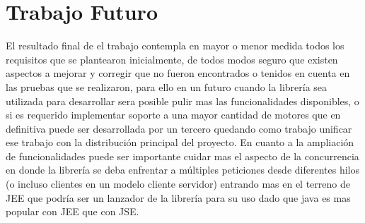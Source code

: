 \chapter*{Trabajo Futuro}
El resultado final de el trabajo contempla en mayor o menor medida todos los requisitos que se plantearon inicialmente, de todos modos seguro que existen aspectos a mejorar y corregir que no fueron encontrados o tenidos en cuenta en las pruebas que se realizaron, para ello en un futuro cuando la librería sea utilizada para desarrollar sera posible pulir mas las funcionalidades disponibles, o si es requerido implementar soporte a una mayor cantidad de motores que en definitiva puede ser desarrollada por un tercero quedando como trabajo unificar ese trabajo con la distribución principal del proyecto.
En cuanto a la ampliación de funcionalidades puede ser importante cuidar mas el aspecto de la concurrencia en donde la librería se deba enfrentar a múltiples peticiones desde diferentes hilos (o incluso clientes en un modelo cliente servidor) entrando mas en el terreno de JEE que podría ser un lanzador de la librería para su uso dado que java es mas popular con JEE que con JSE.
 